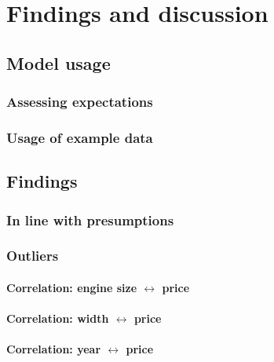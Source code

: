 \chapter{Findings and discussion}

\section{Model usage}
\subsection{Assessing expectations}
\subsection{Usage of example data}
\section{Findings}
\subsection{In line with presumptions}
\subsection{Outliers}
\subsubsection{Correlation: engine size $\leftrightarrow$ price}
\subsubsection{Correlation: width $\leftrightarrow$ price}
\subsubsection{Correlation: year $\leftrightarrow$ price}
